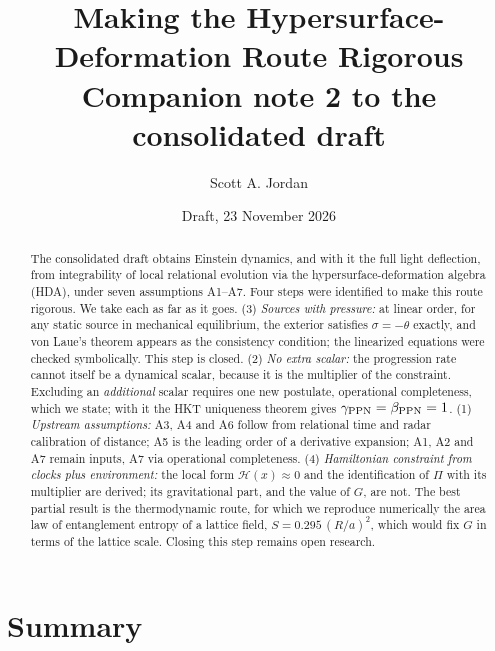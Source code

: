 \documentclass[11pt]{article}
\title{Making the Hypersurface-Deformation Route Rigorous\\[4pt]
\large Companion note 2 to the consolidated draft}
\author{Scott A. Jordan}
\date{Draft, 23 November 2026}
\newcommand{\Pg}{\Pi}
\newcommand{\thP}{\theta}
\newcommand{\sgP}{\sigma}
\theoremstyle{plain}
\theoremstyle{definition}
\theoremstyle{remark}
\begin{document}
\maketitle

\begin{abstract}
The consolidated draft obtains Einstein dynamics, and with it the full light deflection, from integrability of local relational evolution via the hypersurface-deformation algebra (HDA), under seven assumptions A1--A7. Four steps were identified to make this route rigorous. We take each as far as it goes. (3) \emph{Sources with pressure:} at linear order, for any static source in mechanical equilibrium, the exterior satisfies $\sgP=-\thP$ exactly, and von Laue's theorem appears as the consistency condition; the linearized equations were checked symbolically. This step is closed. (2) \emph{No extra scalar:} the progression rate cannot itself be a dynamical scalar, because it is the multiplier of the constraint. Excluding an \emph{additional} scalar requires one new postulate, operational completeness, which we state; with it the HKT uniqueness theorem gives $\gamma_{\rm PPN}=\beta_{\rm PPN}=1$. (1) \emph{Upstream assumptions:} A3, A4 and A6 follow from relational time and radar calibration of distance; A5 is the leading order of a derivative expansion; A1, A2 and A7 remain inputs, A7 via operational completeness. (4) \emph{Hamiltonian constraint from clocks plus environment:} the local form $\mathcal H(x)\approx0$ and the identification of $\Pg$ with its multiplier are derived; its gravitational part, and the value of $G$, are not. The best partial result is the thermodynamic route, for which we reproduce numerically the area law of entanglement entropy of a lattice field, $S=0.295\,(R/a)^2$, which would fix $G$ in terms of the lattice scale. Closing this step remains open research.
\end{abstract}

\tableofcontents

\section{Summary}
\end{document}
